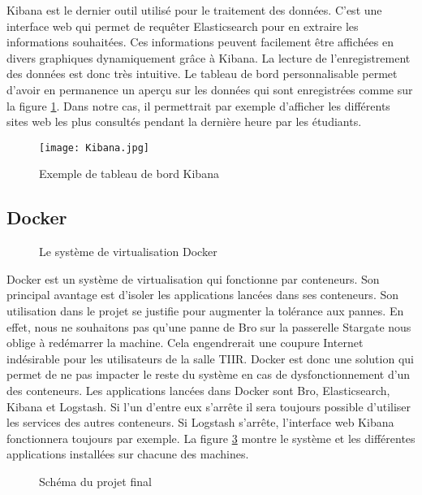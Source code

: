 Kibana est le dernier outil utilisé pour le traitement des données. C'est une interface web qui permet de requêter Elasticsearch pour en extraire les informations souhaitées. Ces informations peuvent facilement être affichées en divers graphiques dynamiquement grâce à Kibana. La lecture de l'enregistrement des données est donc très intuitive. Le tableau de bord personnalisable permet d'avoir en permanence un aperçu sur les données qui sont enregistrées comme sur la figure \ref{kibana}. Dans notre cas, il permettrait par exemple d'afficher les différents sites web les plus consultés pendant la dernière heure par les étudiants.

\begin{figure}[!h]
\centering
\texttt{[image: Kibana.jpg]}
\caption{Exemple de tableau de bord Kibana}
\label{kibana}
\end{figure}

\subsection{Docker}

\begin{figure}[!h]
\centering
\def\svgwidth{0.5\columnwidth}

\caption{Le système de virtualisation Docker}
\label{docker}
\end{figure}

Docker est un système de virtualisation qui fonctionne par conteneurs. Son principal avantage est d'isoler les applications lancées dans ses conteneurs. Son utilisation dans le projet se justifie pour augmenter la tolérance aux pannes. En effet, nous ne souhaitons pas qu'une panne de Bro sur la passerelle Stargate nous oblige à redémarrer la machine. Cela engendrerait une coupure Internet indésirable pour les utilisateurs de la salle TIIR. Docker est donc une solution qui permet de ne pas impacter le reste du système en cas de dysfonctionnement d'un des conteneurs. Les applications lancées dans Docker sont Bro, Elasticsearch, Kibana et Logstash. Si l'un d'entre eux s'arrête il sera toujours possible d'utiliser les services des autres conteneurs. Si Logstash s'arrête, l'interface web Kibana fonctionnera toujours par exemple. La figure \ref{projet_final} montre le système et les différentes applications installées sur chacune des machines.

\begin{figure}[!h]
\centering
\def\svgwidth{\columnwidth}

\caption{Schéma du projet final}
\label{projet_final}
\end{figure}


